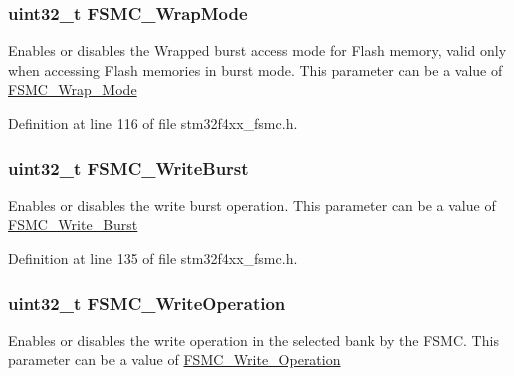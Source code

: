 \hypertarget{struct_f_s_m_c___n_o_r_s_r_a_m_init_type_def_a62dd24d87fe026df5e35dc58a00988b4}{
\subsubsection[{F\-S\-M\-C\-\_\-\-Wrap\-Mode}]{\setlength{\rightskip}{0pt plus 5cm}uint32\-\_\-t F\-S\-M\-C\-\_\-\-Wrap\-Mode}}\label{struct_f_s_m_c___n_o_r_s_r_a_m_init_type_def_a62dd24d87fe026df5e35dc58a00988b4}
Enables or disables the Wrapped burst access mode for Flash memory, valid only when accessing Flash memories in burst mode. This parameter can be a value of \hyperlink{group___f_s_m_c___wrap___mode}{F\-S\-M\-C\-\_\-\-Wrap\-\_\-\-Mode} 

Definition at line 116 of file stm32f4xx\-\_\-fsmc.\-h.

\hypertarget{struct_f_s_m_c___n_o_r_s_r_a_m_init_type_def_a9f46fdb3f72340b6584d34501c19dbd4}{
\subsubsection[{F\-S\-M\-C\-\_\-\-Write\-Burst}]{\setlength{\rightskip}{0pt plus 5cm}uint32\-\_\-t F\-S\-M\-C\-\_\-\-Write\-Burst}}\label{struct_f_s_m_c___n_o_r_s_r_a_m_init_type_def_a9f46fdb3f72340b6584d34501c19dbd4}
Enables or disables the write burst operation. This parameter can be a value of \hyperlink{group___f_s_m_c___write___burst}{F\-S\-M\-C\-\_\-\-Write\-\_\-\-Burst} 

Definition at line 135 of file stm32f4xx\-\_\-fsmc.\-h.

\hypertarget{struct_f_s_m_c___n_o_r_s_r_a_m_init_type_def_a3a876d65250ab693595b9b840ad63676}{
\subsubsection[{F\-S\-M\-C\-\_\-\-Write\-Operation}]{\setlength{\rightskip}{0pt plus 5cm}uint32\-\_\-t F\-S\-M\-C\-\_\-\-Write\-Operation}}\label{struct_f_s_m_c___n_o_r_s_r_a_m_init_type_def_a3a876d65250ab693595b9b840ad63676}
Enables or disables the write operation in the selected bank by the F\-S\-M\-C. This parameter can be a value of \hyperlink{group___f_s_m_c___write___operation}{F\-S\-M\-C\-\_\-\-Write\-\_\-\-Operation} 

